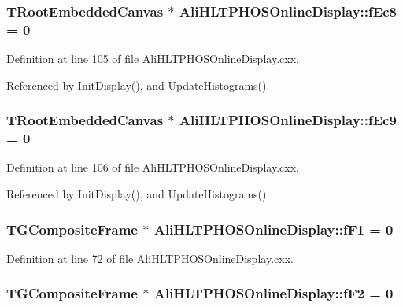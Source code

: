 \subsubsection{\setlength{\rightskip}{0pt plus 5cm}TRoot\-Embedded\-Canvas $\ast$ {\bf Ali\-HLTPHOSOnline\-Display::f\-Ec8} = 0\hspace{0.3cm}{\tt  [static, private]}}\label{classAliHLTPHOSOnlineDisplay_v29}




Definition at line 105 of file Ali\-HLTPHOSOnline\-Display.cxx.

Referenced by Init\-Display(), and Update\-Histograms().
\subsubsection{\setlength{\rightskip}{0pt plus 5cm}TRoot\-Embedded\-Canvas $\ast$ {\bf Ali\-HLTPHOSOnline\-Display::f\-Ec9} = 0\hspace{0.3cm}{\tt  [static, private]}}\label{classAliHLTPHOSOnlineDisplay_v30}




Definition at line 106 of file Ali\-HLTPHOSOnline\-Display.cxx.

Referenced by Init\-Display(), and Update\-Histograms().
\subsubsection{\setlength{\rightskip}{0pt plus 5cm}TGComposite\-Frame $\ast$ {\bf Ali\-HLTPHOSOnline\-Display::f\-F1} = 0\hspace{0.3cm}{\tt  [static, private]}}\label{classAliHLTPHOSOnlineDisplay_v1}




Definition at line 72 of file Ali\-HLTPHOSOnline\-Display.cxx.
\subsubsection{\setlength{\rightskip}{0pt plus 5cm}TGComposite\-Frame $\ast$ {\bf Ali\-HLTPHOSOnline\-Display::f\-F2} = 0\hspace{0.3cm}{\tt  [static, private]}}\label{classAliHLTPHOSOnlineDisplay_v2}




